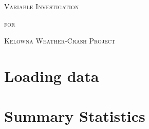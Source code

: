 \documentclass[11pt, a4paper]{article}
\begin{document}


\begin{center}
\Large{\textsc{Variable Investigation}}
\par
\normalsize{\textsc{for}}
\par
\large{\textsc{Kelowna Weather-Crash Project}}
\end{center}


\vspace{0.917 pc} %

\tableofcontents


\pagebreak
\section{Loading data}



\section{Summary Statistics}
\end{document}

